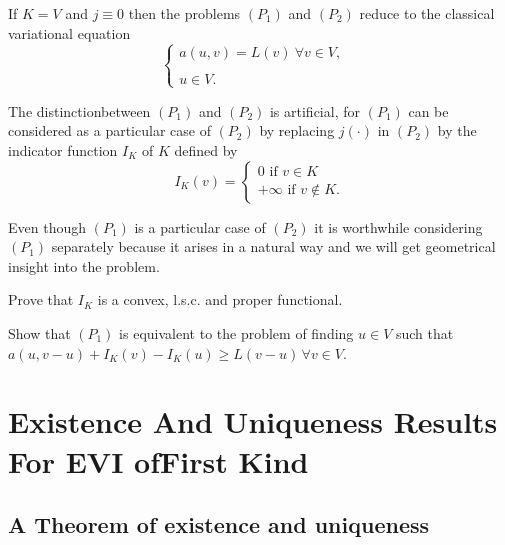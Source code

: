 \begin{remark}\label{c1:rem2.2}
If $K = V$ and $j \equiv 0$ then the problems $(P_1)$ and $(P_2)$
reduce to the classical variational equation 
\begin{equation*}
\begin{cases}
a(u, v) = L(v)~\forall v \in V,\\
&\\
u \in V.
\end{cases}
\end{equation*}
\end{remark}

\begin{remark}\label{c1:rem2.3}
The distinction\pageoriginale between $(P_1)$ and $(P_2)$ is artificial, for $(P_1)$
can be considered as a particular case of $(P_2)$ by replacing
$j(\cdot)$ in $(P_2)$ by the indicator function $I_K$ of $K$ defined
by  
\begin{equation*}
I_K(v) =
\begin{cases}
0 \text{ if } v \in K\\
+\infty \text{ if } v \not \in K.
\end{cases}
\end{equation*}
\end{remark}

Even though $(P_1)$ is a particular case of $(P_2)$ it is worthwhile
considering $(P_1)$ separately because it arises in a natural way and
we will get geometrical insight into the problem. 

\begin{exercise}\label{c1:exer2.1}%
Prove that $I_K$ is a convex, l.s.c. and proper functional. 
\end{exercise}

\begin{exercise}\label{c1:exer2.2}%
Show that $(P_1)$ is equivalent to the problem of finding $u \in
V$ such that $a(u, v - u) + I_K(v) - I_K(u) \geq L(v - u)\, \forall
v \in V$. 
\end{exercise}

\section[Existence And Uniqueness Results 
For EVI...]{Existence And Uniqueness Results 
For EVI of\hfil\break First Kind}\label{c1:s3}%

\subsection{A Theorem of existence and
  uniqueness}\label{c1:ss3.1}%

